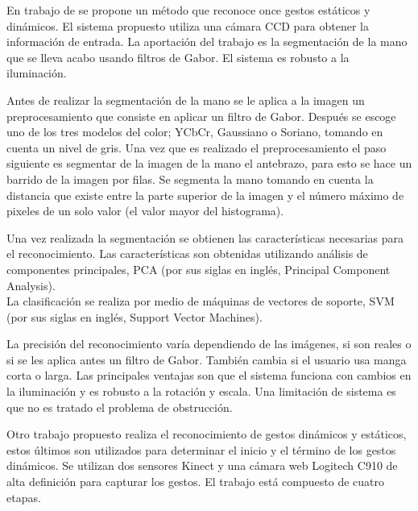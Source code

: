 
En trabajo de \citep{Huang2011} se propone un método que reconoce once gestos estáticos y dinámicos. El sistema propuesto utiliza una cámara CCD para obtener la información de entrada. La aportación del trabajo es la segmentación de la mano que se lleva acabo usando filtros de Gabor. El sistema es robusto a la iluminación. 
 
Antes de realizar la segmentación de la mano se le aplica a la imagen un preprocesamiento que consiste en aplicar un filtro de Gabor. Después se escoge uno de los tres modelos del color; YCbCr, Gaussiano o Soriano, tomando en cuenta un nivel de gris.  
Una vez que es realizado el preprocesamiento el paso siguiente es segmentar de la imagen de la mano el antebrazo, para esto se hace un barrido de la imagen por filas. Se segmenta la mano tomando en cuenta la distancia que existe entre la parte superior de la imagen y el número máximo de pixeles de un solo valor (el valor mayor del histograma).

Una vez realizada la segmentación se obtienen las características necesarias para el reconocimiento. Las características son obtenidas utilizando análisis de componentes principales, PCA (por sus siglas en inglés, Principal Component Analysis).\\
La clasificación se realiza por medio de máquinas de vectores de soporte, SVM (por sus siglas en inglés, Support Vector Machines).   

La precisión del reconocimiento varía dependiendo de las imágenes, si son reales o si se les aplica antes un filtro de Gabor. También cambia si el usuario usa manga corta o larga.  
Las principales ventajas son que el sistema funciona con cambios en la iluminación y es robusto a la rotación y escala. Una limitación de sistema es que no es tratado el problema de obstrucción. 


Otro trabajo propuesto \citep{Caputo2012} realiza el reconocimiento de  gestos dinámicos y estáticos, estos últimos son utilizados para determinar el inicio y el término de los gestos dinámicos. Se utilizan dos sensores Kinect y una cámara web Logitech C910 de alta definición para capturar los gestos. El trabajo está compuesto de cuatro etapas.

